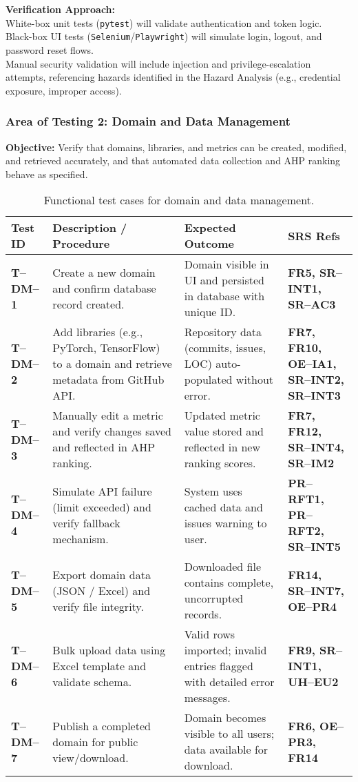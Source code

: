 \documentclass[12pt, titlepage]{article}
\begin{document}
\noindent\textbf{Verification Approach:}\\
White-box unit tests (\texttt{pytest}) will validate authentication and token logic.\\
Black-box UI tests (\texttt{Selenium}/\texttt{Playwright}) will simulate login, logout, and password reset flows.\\
Manual security validation will include injection and privilege-escalation attempts, referencing hazards identified in the Hazard Analysis (e.g., credential exposure, improper access).\\[0.5em]


\subsubsection{Area of Testing 2: Domain and Data Management}
\textbf{Objective:} Verify that domains, libraries, and metrics can be created, modified, and retrieved accurately, and that automated data collection and AHP ranking behave as specified.

\begin{table}[H]
\centering
\begin{tabularx}{\textwidth}{|l|X|X|X|}
\hline
\textbf{Test ID} & \textbf{Description / Procedure} & \textbf{Expected Outcome} & \textbf{SRS Refs} \\
\hline
\textbf{T--DM--1} &
Create a new domain and confirm database record created. &
Domain visible in UI and persisted in database with unique ID. &
\textbf{FR5, SR--INT1, SR--AC3} \\
\hline
\textbf{T--DM--2} &
Add libraries (e.g., PyTorch, TensorFlow) to a domain and retrieve metadata from GitHub API. &
Repository data (commits, issues, LOC) auto-populated without error. &
\textbf{FR7, FR10, OE--IA1, SR--INT2, SR--INT3} \\
\hline
\textbf{T--DM--3} &
Manually edit a metric and verify changes saved and reflected in AHP ranking. &
Updated metric value stored and reflected in new ranking scores. &
\textbf{FR7, FR12, SR--INT4, SR--IM2} \\
\hline
\textbf{T--DM--4} &
Simulate API failure (limit exceeded) and verify fallback mechanism. &
System uses cached data and issues warning to user. &
\textbf{PR--RFT1, PR--RFT2, SR--INT5} \\
\hline
\textbf{T--DM--5} &
Export domain data (JSON / Excel) and verify file integrity. &
Downloaded file contains complete, uncorrupted records. &
\textbf{FR14, SR--INT7, OE--PR4} \\
\hline
\textbf{T--DM--6} &
Bulk upload data using Excel template and validate schema. &
Valid rows imported; invalid entries flagged with detailed error messages. &
\textbf{FR9, SR--INT1, UH--EU2} \\
\hline
\textbf{T--DM--7} &
Publish a completed domain for public view/download. &
Domain becomes visible to all users; data available for download. &
\textbf{FR6, OE--PR3, FR14} \\
\hline
\end{tabularx}
\caption{Functional test cases for domain and data management.}
\end{table}
\end{document}
